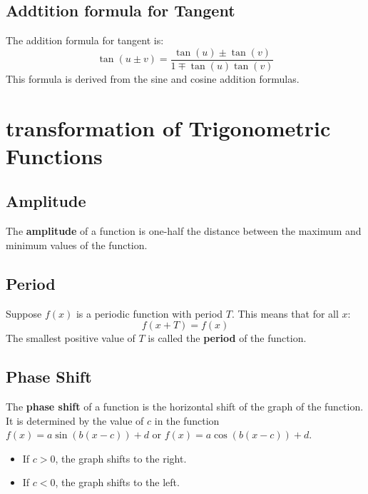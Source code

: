 \subsection{Addtition formula for Tangent}
The addition formula for tangent is:
\[ \tan(u \pm v) = \frac{\tan(u) \pm \tan(v)}{1 \mp \tan(u)\tan(v)} \]
This formula is derived from the sine and cosine addition formulas.

\section{transformation of Trigonometric Functions}
\subsection{Amplitude}
The \textbf{amplitude} of a function is one-half the distance between the maximum and minimum values of the function.

\subsection{Period}
Suppose $f(x)$ is a periodic function with period $T$. This means that for all $x$:
\[ f(x + T) = f(x) \]
The smallest positive value of $T$ is called the \textbf{period} of the function.

\subsection{Phase Shift}
The \textbf{phase shift} of a function is the horizontal shift of the graph of the function. It is determined by the value of $c$ in the function $f(x) = a \sin(b(x - c)) + d$ or $f(x) = a \cos(b(x - c)) + d$.
\begin{itemize}
    \item If $c > 0$, the graph shifts to the right.
    \item If $c < 0$, the graph shifts to the left.
\end{itemize}

